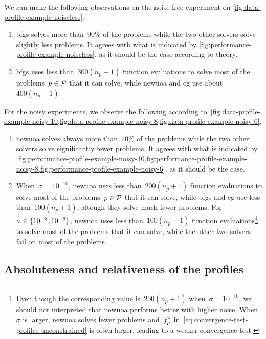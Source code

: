 We can make the following observations on the noise-free experiment on \cref{fig:data-profile-example-noiseless}.
\begin{enumerate}
    \item \Gls{bfgs} solves more than~$90\%$ of the problems while the two other solvers solve slightly less problems.
    It agrees with what is indicated by \cref{fig:performance-profile-example-noiseless}, as it should be the case according to theory.
    \item \Gls{bfgs} uses less than~$300 (n_p + 1)$ function evaluations to solve most of the problems~$p \in \mathcal{P}$ that it can solve, while \gls{newuoa} and \gls{cg} use about~$400 (n_p + 1)$.
\end{enumerate}

For the noisy experiments, we observe the following according to~\cref{fig:data-profile-example-noisy-10,fig:data-profile-example-noisy-8,fig:data-profile-example-noisy-6}.
\begin{enumerate}
    \item \Gls{newuoa} solves always more than~$70\%$ of the problems while the two other solvers solve significantly fewer problems.
    It agrees with what is indicated by \cref{fig:performance-profile-example-noisy-10,fig:performance-profile-example-noisy-8,fig:performance-profile-example-noisy-6}, as it should be the case.
    \item When~$\sigma = 10^{-10}$, \gls{newuoa} uses less than~$200 (n_p + 1)$ function evaluations to solve most of the problems~$p \in \mathcal{P}$ that it can solve, while \gls{bfgs} and \gls{cg} use less than~$100 (n_p + 1)$, altough they solve much fewer problems.
    For~$\sigma \in \{10^{-8}, 10^{-6}\}$, \gls{newuoa} uses less than~$100 (n_p + 1)$ function evaluations\footnote{Even though the corresponding value is~$200 (n_p + 1)$ when~$\sigma = 10^{-10}$, we should not interpreted that \gls{newuoa} performs better with higher noise. When~$\sigma$ is larger, \gls{newuoa} solves fewer problems and~$f_p^{\ast}$ in~\cref{eq:convergence-test-profiles-unconstrained} is often larger, leading to a weaker convergence test.} to solve most of the problems that it can solve, while the other two solvers fail on most of the problems.
\end{enumerate}

\subsection{Absoluteness and relativeness of the profiles}

